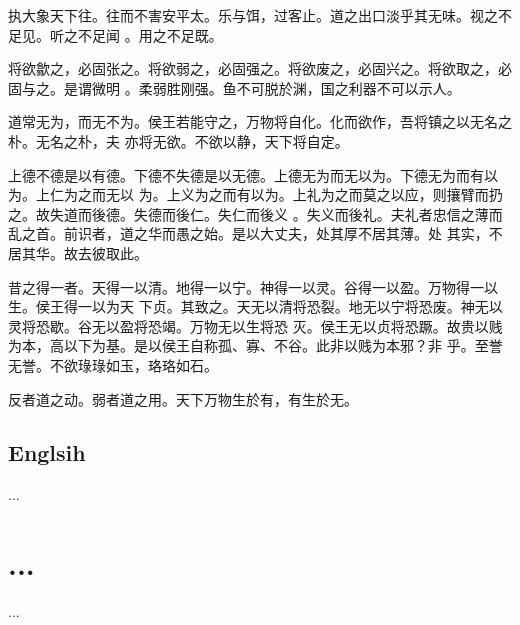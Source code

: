 \documentclass[a4paper, twoside, openany, extrafontsizes]{dlutthesis}
\begin{document}
执大象天下往。往而不害安平太。乐与饵，过客止。道之出口淡乎其无味。视之不足见。听之不足闻
。用之不足既。

将欲歙之，必固张之。将欲弱之，必固强之。将欲废之，必固兴之。将欲取之，必固与之。是谓微明
。柔弱胜刚强。鱼不可脱於渊，国之利器不可以示人。

道常无为，而无不为。侯王若能守之，万物将自化。化而欲作，吾将镇之以无名之朴。无名之朴，夫
亦将无欲。不欲以静，天下将自定。

上德不德是以有德。下德不失德是以无德。上德无为而无以为。下德无为而有以为。上仁为之而无以
为。上义为之而有以为。上礼为之而莫之以应，则攘臂而扔之。故失道而後德。失德而後仁。失仁而後义
。失义而後礼。夫礼者忠信之薄而乱之首。前识者，道之华而愚之始。是以大丈夫，处其厚不居其薄。处
其实，不居其华。故去彼取此。

昔之得一者。天得一以清。地得一以宁。神得一以灵。谷得一以盈。万物得一以生。侯王得一以为天
下贞。其致之。天无以清将恐裂。地无以宁将恐废。神无以灵将恐歇。谷无以盈将恐竭。万物无以生将恐
灭。侯王无以贞将恐蹶。故贵以贱为本，高以下为基。是以侯王自称孤、寡、不谷。此非以贱为本邪？非
乎。至誉无誉。不欲琭琭如玉，珞珞如石。

反者道之动。弱者道之用。天下万物生於有，有生於无。

\section{Englsih}
\label{sec:englsih}

\lipsum[1-9]


\printpagenotes
\begin{thebibliography}
	...
\end{thebibliography}
\appendix
\chapter{...}
...
\backmatter
\end{document}
